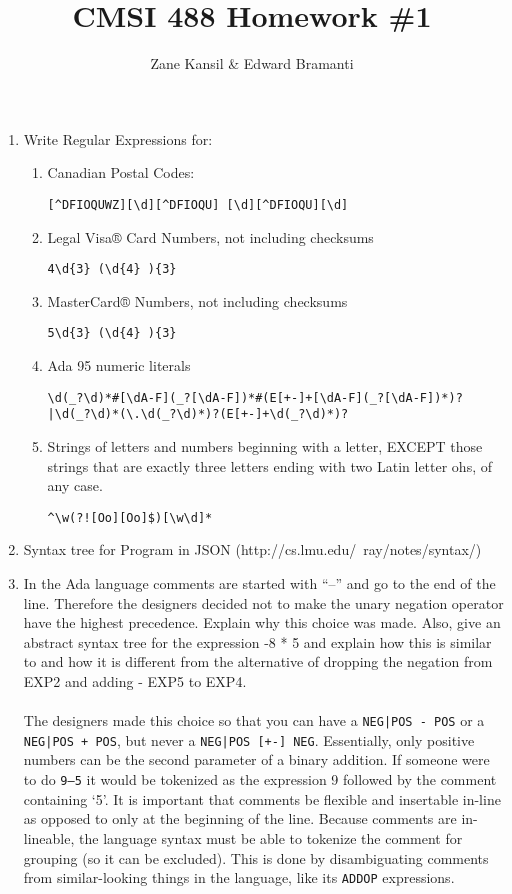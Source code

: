 \documentclass{article}
\begin{document}
\title{CMSI 488 Homework \#1}
\author{Zane Kansil \& Edward Bramanti}
\maketitle
\begin{enumerate}
\item Write Regular Expressions for:
\begin{enumerate}
\item Canadian Postal Codes:
\begin{verbatim}
[^DFIOQUWZ][\d][^DFIOQU] [\d][^DFIOQU][\d]
\end{verbatim}
\item Legal Visa® Card Numbers, not including checksums
\begin{verbatim}
4\d{3} (\d{4} ){3}
\end{verbatim}
\item MasterCard® Numbers, not including checksums
\begin{verbatim}
5\d{3} (\d{4} ){3}
\end{verbatim}
\item Ada 95 numeric literals
\begin{verbatim}
\d(_?\d)*#[\dA-F](_?[\dA-F])*#(E[+-]+[\dA-F](_?[\dA-F])*)?
|\d(_?\d)*(\.\d(_?\d)*)?(E[+-]+\d(_?\d)*)?
\end{verbatim}
\item Strings of letters and numbers beginning with a letter, EXCEPT those strings that are exactly three letters ending with two Latin letter ohs, of any case.
\begin{verbatim}
^\w(?![Oo][Oo]$)[\w\d]*
\end{verbatim}
\end{enumerate}
\pagebreak
\item Syntax tree for Program in JSON (http://cs.lmu.edu/~ray/notes/syntax/)

\pagebreak
\item In the Ada language comments are started with ``--'' and go to the end of the line. Therefore the designers decided not to make the unary negation operator have the highest precedence. Explain why this choice was made. Also, give an abstract syntax tree for the expression -8 * 5 and explain how this is similar to and how it is different from the alternative of dropping the negation from EXP2 and adding - EXP5 to EXP4.\\
\\
The designers made this choice so that you can have a \texttt{NEG|POS - POS} or a \texttt{NEG|POS + POS}, but never a \texttt{NEG|POS [+-] NEG}. Essentially, only positive numbers can be the second parameter of a binary addition. If someone were to do \texttt{9--5} it would be tokenized as the expression 9 followed by the comment containing `5'. It is important that comments be flexible and insertable in-line as opposed to only at the beginning of the line. Because comments are in-lineable, the language syntax must be able to tokenize the comment for grouping (so it can be excluded). This is done by disambiguating comments from similar-looking things in the language, like its \texttt{ADDOP} expressions.\\

\end{enumerate}
\end{document}
